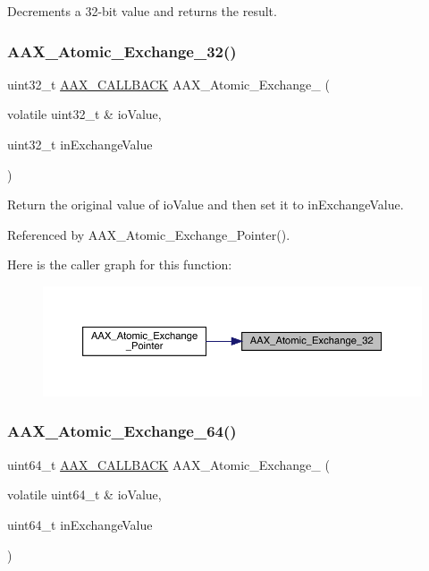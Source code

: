 Decrements a 32-\/bit value and returns the result. 

\mbox{\label{a00398_a44eb82707be40dd559db9051317c10d0}} 
\subsubsection{\texorpdfstring{AAX\_Atomic\_Exchange\_32()}{AAX\_Atomic\_Exchange\_32()}}
{\footnotesize\ttfamily uint32\+\_\+t \mbox{\hyperlink{a00392_aaa22112139aa627574b1ef562f579d43}{A\+A\+X\+\_\+\+C\+A\+L\+L\+B\+A\+CK}} A\+A\+X\+\_\+\+Atomic\+\_\+\+Exchange\+\_ (\begin{DoxyParamCaption}\item[{volatile uint32\+\_\+t \&}]{io\+Value,  }\item[{uint32\+\_\+t}]{in\+Exchange\+Value }\end{DoxyParamCaption})}



Return the original value of io\+Value and then set it to in\+Exchange\+Value. 



Referenced by A\+A\+X\+\_\+\+Atomic\+\_\+\+Exchange\+\_\+\+Pointer().

Here is the caller graph for this function\+:
\nopagebreak
\begin{figure}[H]
\begin{center}
\leavevmode
\includegraphics[width=350pt]{a00398_a44eb82707be40dd559db9051317c10d0_icgraph}
\end{center}
\end{figure}
\mbox{\label{a00398_a0a683337ef8627f1e2b01e69d5f11cb0}} 
\subsubsection{\texorpdfstring{AAX\_Atomic\_Exchange\_64()}{AAX\_Atomic\_Exchange\_64()}}
{\footnotesize\ttfamily uint64\+\_\+t \mbox{\hyperlink{a00392_aaa22112139aa627574b1ef562f579d43}{A\+A\+X\+\_\+\+C\+A\+L\+L\+B\+A\+CK}} A\+A\+X\+\_\+\+Atomic\+\_\+\+Exchange\+\_ (\begin{DoxyParamCaption}\item[{volatile uint64\+\_\+t \&}]{io\+Value,  }\item[{uint64\+\_\+t}]{in\+Exchange\+Value }\end{DoxyParamCaption})}



